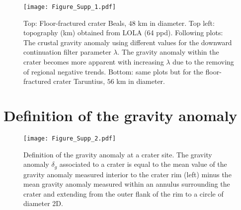 \begin{figure}[h!]
  \graphicspath{ {/Users/thorey/Documents/These/Projet/FFC/Gravi_GRAIL/Article/Papier/SOUMISSION_2_EPSL/} }
  \begin{center}
    \texttt{[image: Figure\_Supp\_1.pdf]}
    \caption{Top: Floor-fractured  crater Beals, $48$ km  in diameter.
      Top  left:   topography  (km)  obtained  from   LOLA  (64  ppd).
      Following  plots: The  crustal gravity  anomaly using  different
      values for the downward continuation filter parameter $\lambda$.
      The gravity anomaly within the crater becomes more apparent with
      increasing $\lambda$  due to  the removing of  regional negative
      trends.  Bottom:  same plots but for  the floor-fractured crater
      Taruntius, $56$ km in diameter.}
    \label{Figure_Supp_1}
  \end{center}
\end{figure}

\section{Definition of the gravity anomaly}
\begin{figure}[h!]
  \graphicspath{ {/Users/thorey/Documents/These/Projet/FFC/Gravi_GRAIL/Article/Papier/SOUMISSION_2_EPSL/} }
  \begin{center}
    \texttt{[image: Figure\_Supp\_2.pdf]}
    \caption{Definition of the  gravity anomaly at a  crater site. The
      gravity anomaly  $\delta_g$ associated to  a crater is  equal to
      the mean value  of the gravity anomaly measured  interior to the
      crater rim (left) minus the mean gravity anomaly measured within
      an annulus surrounding  the crater and extending  from the outer
      flank of the rim to a circle of diameter 2D.}
    \label{Figure_Supp_2}
  \end{center}
\end{figure}

